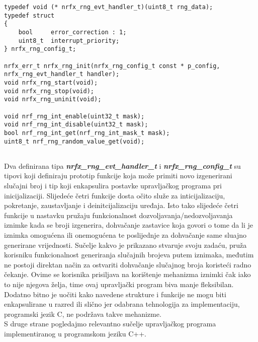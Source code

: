 \lstset{language=C, tabsize=2, frame=single, breaklines=true, showstringspaces=false}
\begin{lstlisting}
typedef void (* nrfx_rng_evt_handler_t)(uint8_t rng_data);
typedef struct
{
    bool     error_correction : 1;
    uint8_t  interrupt_priority;
} nrfx_rng_config_t;

nrfx_err_t nrfx_rng_init(nrfx_rng_config_t const * p_config, nrfx_rng_evt_handler_t handler);
void nrfx_rng_start(void);
void nrfx_rng_stop(void);
void nrfx_rng_uninit(void);

void nrf_rng_int_enable(uint32_t mask);
void nrf_rng_int_disable(uint32_t mask);
bool nrf_rng_int_get(nrf_rng_int_mask_t mask);
uint8_t nrf_rng_random_value_get(void);
          
\end{lstlisting}
Dva definirana tipa \textbf{\textit{nrfx\_rng\_evt\_handler\_t}} i \textbf{\textit{nrfx\_rng\_config\_t}} su tipovi koji definiraju prototip funkcije koja može primiti novo izgenerirani slučajni broj i tip koji enkapsulira postavke upravljačkog programa pri inicijalizaciji. Slijedeće četri funkcije dosta očito služe za inticijalizaciju, pokretanje, zaustavljanje i deinitcijalizaciju uređaja. Isto tako slijedeće četri funkcije u nastavku pružaju funkcionalnost dozvoljavanja/nedozvoljavanja iznimke kada se broji izgenerira, dohvačanje zastavice koja govori o tome da li je iznimka omogućena ili onemogućena te poslijednje za dohvačanje same sluajno generirane vrijednosti. Sučelje kakvo je prikazano stvaruje svoju zadaću, pruža korisniku funkcionalnost generiranja slučajnih brojeva putem iznimaka, međutim ne postoji direktan način za ostvariti dohvačanje slučajnog broja koristeći radno čekanje. Ovime se korisnika prisiljava na korištenje mehanizma iznimki čak iako to nije njegova želja, time ovaj upravljački program biva manje fleksibilan. Dodatno bitno je uočiti kako navedene strukture i funkcije ne mogu biti enkapsulirane u razred ili slično jer odabrana tehnologija za implementaciju, programski jezik C, ne podržava takve mehanizme. \\
S druge strane pogledajmo relevantno sučelje upravljačkog programa implementiranog u programskom jeziku C++.
\lstset{language=C++, tabsize=2, frame=single, breaklines=true, showstringspaces=false}
